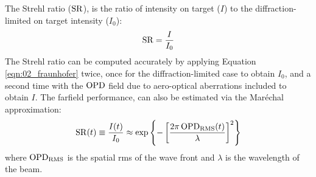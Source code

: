 The Strehl ratio ($\operatorname{SR}$), is the ratio of intensity on target ($I$) to the diffraction-limited on target intensity ($I_0$):
\begin{equation}
  \operatorname{SR}=\frac{I}{I_0}
  \label{eqn:02_strehl_simple}
\end{equation}
The Strehl ratio can be computed accurately by applying Equation \ref{eqn:02_fraunhofer} twice, once for the diffraction-limited case to obtain $I_0$, and a second time with the $\operatorname{OPD}$ field due to aero-optical aberrations included to obtain $I$.
The farfield performance, can also be estimated via the Mar\'{e}chal approximation:
\begin{equation}
  \operatorname{SR}(t) \equiv \frac{I(t)}{I_0} \approx \exp \left\{-\left[\frac{2\pi \operatorname{OPD_{RMS}}(t)}{\lambda}\right]^2\right\}
  \label{eqn:02_strehl_ratio}
\end{equation}
where $\operatorname{OPD_{RMS}}$ is the spatial rms of the wave front and $\lambda$ is the wavelength of the beam.
